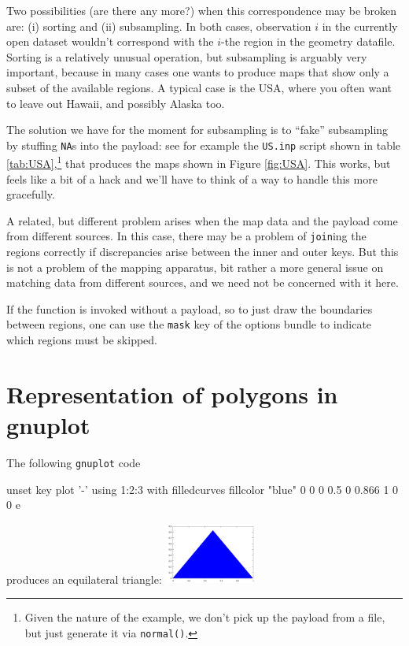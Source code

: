 \documentclass{article}
\begin{document}
Two possibilities (are there any more?) when this correspondence may
be broken are: (i) sorting and (ii) subsampling. In both cases,
observation $i$ in the currently open dataset wouldn't correspond with
the $i$-the region in the geometry datafile. Sorting is a relatively
unusual operation, but subsampling is arguably very important, because
in many cases one wants to produce maps that show only a subset of the
available regions. A typical case is the USA, where you often want to
leave out Hawaii, and possibly Alaska too.

The solution we have for the moment for subsampling is to ``fake''
subsampling by stuffing \texttt{NA}s into the payload: see for example
the \texttt{US.inp} script shown in table
\ref{tab:USA},\footnote{Given the nature of the example, we don't pick
  up the payload from a file, but just generate it via
  \texttt{normal()}.}  that produces the maps shown in Figure
\ref{fig:USA}. This works, but feels like a bit of a hack and we'll
have to think of a way to handle this more gracefully.

A related, but different problem arises when the map data and the
payload come from different sources. In this case, there may be a
problem of \texttt{join}ing the regions correctly if discrepancies
arise between the inner and outer keys. But this is not a problem of
the mapping apparatus, bit rather a more general issue on matching
data from different sources, and we need not be concerned with it
here.

If the  function is invoked without a payload, so to just
draw the boundaries between regions, one can use the \texttt{mask} key
of the options bundle to indicate which regions must be skipped.

\clearpage
\appendix

\section{Representation of polygons in gnuplot}
\label{sec:gnuplot}

The
following \texttt{gnuplot} code
\begin{code}
  unset key
  plot '-' using 1:2:3 with filledcurves fillcolor "blue"
  0 0 0
  0.5 0 0.866
  1 0 0
  e
\end{code}
produces an equilateral triangle: \includegraphics[height=2cm]{triangle.png}
\end{document}
